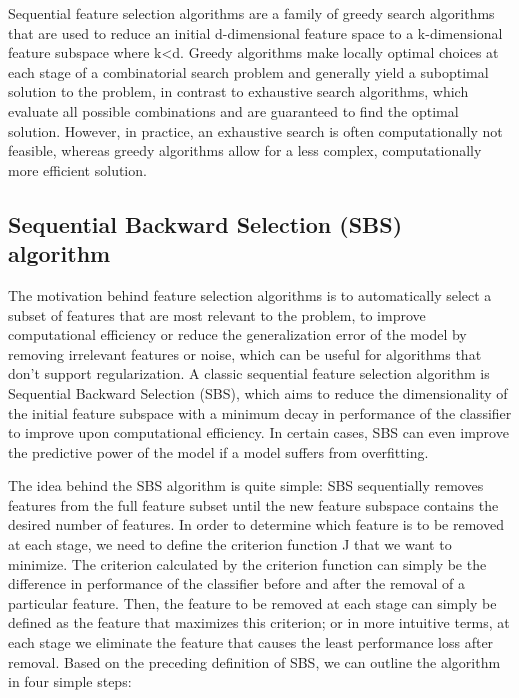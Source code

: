 \documentclass[11pt]{article}
\begin{document}
    Sequential feature selection algorithms are a family of greedy search algorithms that are used to reduce an initial d-dimensional feature space to a k-dimensional feature subspace where k<d.
    Greedy algorithms make locally optimal choices at each stage of a combinatorial search problem and generally yield a suboptimal solution to the problem, in contrast to exhaustive search algorithms, which evaluate all possible combinations and are guaranteed to find the optimal solution.
    However, in practice, an exhaustive search is often computationally not feasible, whereas greedy algorithms allow for a less complex, computationally more efficient solution.

    \subsection{Sequential Backward Selection (SBS) algorithm} \label{subsec:sbs_algorithm}

    The motivation behind feature selection algorithms is to automatically select a subset of features that are most relevant to the problem, to improve computational efficiency or reduce the generalization error of the model by removing irrelevant features or noise, which can be useful for algorithms that don't support regularization.
    A classic sequential feature selection algorithm is Sequential Backward Selection (SBS), which aims to reduce the dimensionality of the initial feature subspace with a minimum decay in performance of the classifier to improve upon computational efficiency.
    In certain cases, SBS can even improve the predictive power of the model if a model suffers from overfitting.

    The idea behind the SBS algorithm is quite simple: SBS sequentially removes features from the full feature subset until the new feature subspace contains the desired number of features.
    In order to determine which feature is to be removed at each stage, we need to define the criterion function J that we want to minimize.
    The criterion calculated by the criterion function can simply be the difference in performance of the classifier before and after the removal of a particular feature.
    Then, the feature to be removed at each stage can simply be defined as the feature that maximizes this criterion;
    or in more intuitive terms, at each stage we eliminate the feature that causes the least performance loss after removal.
    Based on the preceding definition of SBS, we can outline the algorithm in four simple steps:
\end{document}

